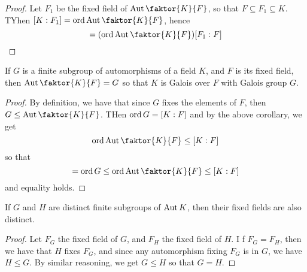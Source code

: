 \begin{proof}
    Let $F_1$ be the fixed field of $\Aut{\faktor{K}{F}}$, so that $F \subseteq
    F_1 \subseteq K$. TYhen $[K:F_1]=\ord{\Aut{\faktor{K}{F}}}$, hence
    \begin{equation*}
        [K:F]=(\ord{\Aut{\faktor{K}{F}}})[F_1:F]
    \end{equation*}
\end{proof}
\begin{corollary}
    If $G$ is a finite subgroup of automorphisms of a field  $K$, and $F$ is its
    fixed field, then  $\Aut{\faktor{K}{F}}=G$ so that $K$ is Galois over $F$
    with Galois group  $G$.
\end{corollary}
\begin{proof}
    By definition, we have that since $G$ fixes the elements of $F$, then $G \leq
    \Aut{\faktor{K}{F}}$. THen $\operatorname{ord}{G}=[K:F]$ and by the above corollary, we
    get
    \begin{equation*}
        \ord{\Aut{\faktor{K}{F}}} \leq [K:F]
    \end{equation*}
    so that
    \begin{equation*}
        [K:F]=\ord{G} \leq \ord{\Aut{\faktor{K}{F}}} \leq [K:F]
    \end{equation*}
    and equality holds.
\end{proof}
\begin{corollary}
    If $G$ and  $H$ are distinct finite subgroups of  $\operatorname{Aut}{K}$, then their
    fixed fields are also distinct.
\end{corollary}
\begin{proof}
    Let $F_G$ the fixed field of  $G$, and  $F_H$ the fixed field of  $H$. I f
    $F_G=F_H$, then we have that $H$ fixes  $F_G$, and since any automorphism
    fixing  $F_G$ is in  $G$, we have  $H \leq G$. By similar reasoning, we get
     $G \leq H$ so that  $G=H$.
\end{proof}

